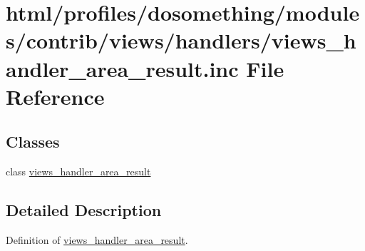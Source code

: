 \hypertarget{views__handler__area__result_8inc}{
\section{html/profiles/dosomething/modules/contrib/views/handlers/views\_\-handler\_\-area\_\-result.inc File Reference}
\label{views__handler__area__result_8inc}
}
\subsection*{Classes}
\begin{DoxyCompactItemize}
\item 
class \hyperlink{classviews__handler__area__result}{views\_\-handler\_\-area\_\-result}
\end{DoxyCompactItemize}


\subsection{Detailed Description}
Definition of \hyperlink{classviews__handler__area__result}{views\_\-handler\_\-area\_\-result}. 